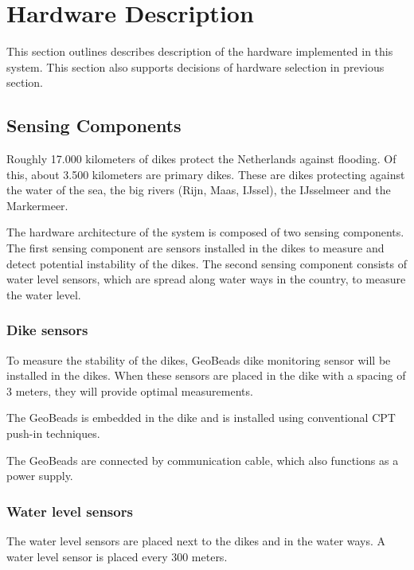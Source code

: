 \clearpage
\section{Hardware Description}
\label{sec:hardware-description}
This section outlines describes description of the hardware implemented in this system. This section also supports decisions of hardware selection in previous section.

\subsection{Sensing Components}
\label{subsec:sensing-components}
Roughly 17.000 kilometers of dikes protect the Netherlands against flooding\cite{DMC}. Of this, about 3.500 kilometers are primary dikes\cite{waterwijzer}. These are dikes protecting against the water of the sea, the big rivers (Rijn, Maas, IJssel), the IJsselmeer and the Markermeer. 

The hardware architecture of the system is composed of two sensing components. The first sensing component are sensors installed in the dikes to measure and detect potential instability of the dikes.
The second sensing component consists of water level sensors, which are spread along water ways in the country, to measure the water level. 

\subsubsection{Dike sensors}
To measure the stability of the dikes, GeoBeads dike monitoring sensor will be installed in the dikes. When these sensors are placed in the dike with a spacing of 3 meters, they will provide optimal measurements\cite{ng180levee}.

The GeoBeads is embedded in the dike and is installed using conventional CPT push-in techniques. %

The GeoBeads are connected by communication cable, which also functions as a power supply. 

\subsubsection{Water level sensors}
The water level sensors are placed next to the dikes and in the water ways. A water level sensor is placed every 300 meters. %

